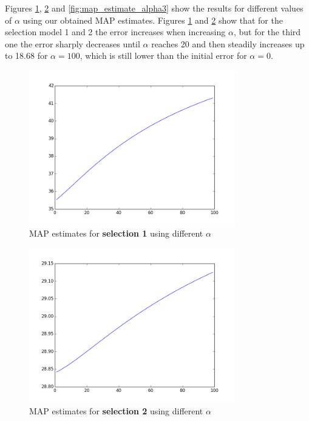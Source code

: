 \documentclass[12pt]{article}
\begin{document}
    Figures \ref{fig:map_estimate_alpha1}, \ref{fig:map_estimate_alpha2} and \ref{fig:map_estimate_alpha3} show the results for different values of $\alpha$ using our obtained MAP estimates. Figures \ref{fig:map_estimate_alpha1} and \ref{fig:map_estimate_alpha2} show that for the selection model 1 and 2 the error increases when increasing $\alpha$, but for the third one the error sharply decreases until $\alpha$ reaches 20 and then steadily increases up to 18.68 for $\alpha = 100$, which is still lower than the initial error for $\alpha = 0$.
    \begin{figure}[h]
      \centering
        \includegraphics[width=0.8\textwidth]{figures/figure_II_2_2_1}
      \caption{MAP estimates for \textbf{selection 1} using different $\alpha$}
      \label{fig:map_estimate_alpha1}
    \end{figure}
    \begin{figure}[h]
      \centering
        \includegraphics[width=0.8\textwidth]{figures/figure_II_2_2_2}
      \caption{MAP estimates for \textbf{selection 2} using different $\alpha$}
      \label{fig:map_estimate_alpha2}
    \end{figure}
\end{document}
